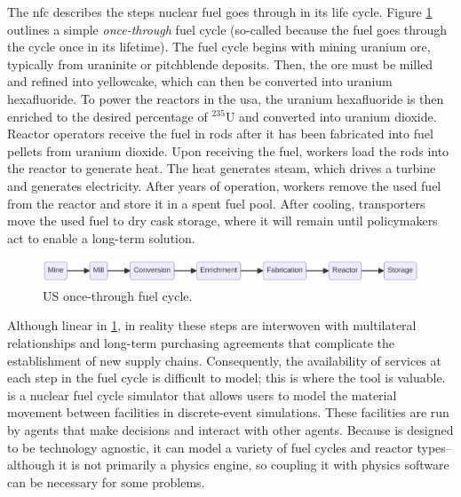 The \gls{nfc} describes the steps nuclear fuel goes through
in its life cycle. Figure \ref{fig:once-through} outlines a simple \textit{once-through} fuel cycle (so-called because the fuel goes through the cycle once in its lifetime). The fuel cycle begins with mining uranium ore, typically from uraninite or pitchblende deposits. Then, the ore must be milled and refined into yellowcake, which can then be converted into uranium hexafluoride. To power the reactors in the \gls{usa}, the uranium hexafluoride is then enriched to the desired percentage of $^{235}$U and converted into uranium dioxide. Reactor operators receive the fuel in rods after it has been fabricated into fuel pellets from uranium dioxide. Upon receiving the fuel, workers load the rods into the reactor to generate heat. The heat generates steam, which drives a turbine and generates electricity. After years of operation, workers remove the used fuel from the reactor and store it in a spent fuel pool. After cooling, transporters move the used fuel to dry cask storage, where it will remain until policymakers act to enable a long-term solution.

\begin{figure}[H]
    \centering
    \includegraphics[scale=0.40]{images/once_through_fc.png}
    \caption{US once-through fuel cycle.}
    \label{fig:once-through}
\end{figure}

Although linear in \ref{fig:once-through}, in reality these steps are interwoven with multilateral relationships and long-term purchasing agreements that complicate the establishment of new supply chains. Consequently, the availability of services at each step in the fuel cycle is difficult to model; this is where the \cyclus \cite{huff_cyclus_intro_2016} tool is valuable. \cyclus is a nuclear fuel cycle simulator that allows users to model the material movement between facilities in discrete-event simulations. These facilities are run by agents that make decisions and interact with other agents. Because \cyclus is designed to be technology agnostic, it can model a variety of fuel cycles and reactor types--although it is not primarily a physics engine, so coupling it with physics software can be necessary for some problems.

